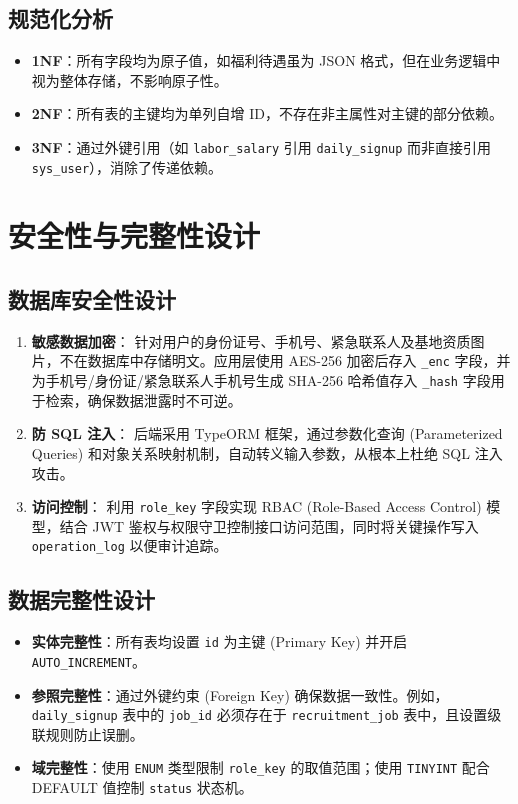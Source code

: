 \documentclass[UTF8,a4paper,12pt]{article}
\begin{document}
\subsection{规范化分析}
\begin{itemize}
    \item \textbf{1NF}：所有字段均为原子值，如福利待遇虽为 JSON 格式，但在业务逻辑中视为整体存储，不影响原子性。
    \item \textbf{2NF}：所有表的主键均为单列自增 ID，不存在非主属性对主键的部分依赖。
    \item \textbf{3NF}：通过外键引用（如 \texttt{labor\_salary} 引用 \texttt{daily\_signup} 而非直接引用 \texttt{sys\_user}），消除了传递依赖。
\end{itemize}

\section{安全性与完整性设计}

\subsection{数据库安全性设计}
\begin{enumerate}
    \item \textbf{敏感数据加密}：
    针对用户的身份证号、手机号、紧急联系人及基地资质图片，不在数据库中存储明文。应用层使用 AES-256 加密后存入 \texttt{\_enc} 字段，并为手机号/身份证/紧急联系人手机号生成 SHA-256 哈希值存入 \texttt{\_hash} 字段用于检索，确保数据泄露时不可逆。
    
    \item \textbf{防 SQL 注入}：
    后端采用 TypeORM 框架，通过参数化查询 (Parameterized Queries) 和对象关系映射机制，自动转义输入参数，从根本上杜绝 SQL 注入攻击。
    
    \item \textbf{访问控制}：
    利用 \texttt{role\_key} 字段实现 RBAC (Role-Based Access Control) 模型，结合 JWT 鉴权与权限守卫控制接口访问范围，同时将关键操作写入 \texttt{operation\_log} 以便审计追踪。
\end{enumerate}

\subsection{数据完整性设计}
\begin{itemize}
    \item \textbf{实体完整性}：所有表均设置 \texttt{id} 为主键 (Primary Key) 并开启 \texttt{AUTO\_INCREMENT}。
    \item \textbf{参照完整性}：通过外键约束 (Foreign Key) 确保数据一致性。例如，\texttt{daily\_signup} 表中的 \texttt{job\_id} 必须存在于 \texttt{recruitment\_job} 表中，且设置级联规则防止误删。
    \item \textbf{域完整性}：使用 \texttt{ENUM} 类型限制 \texttt{role\_key} 的取值范围；使用 \texttt{TINYINT} 配合 DEFAULT 值控制 \texttt{status} 状态机。
\end{itemize}
\end{document}
